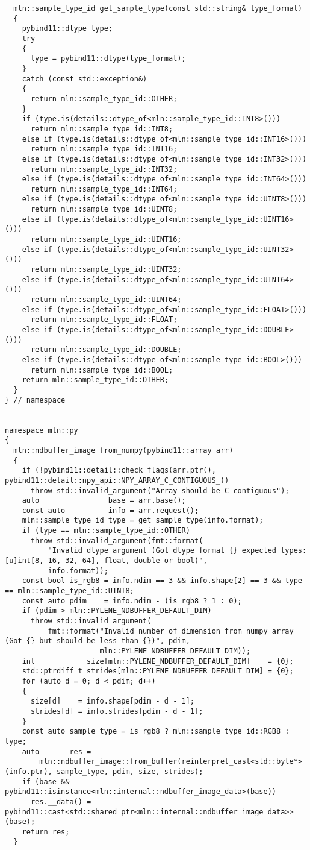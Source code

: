 \begin{verbatim}
  mln::sample_type_id get_sample_type(const std::string& type_format)
  {
    pybind11::dtype type;
    try
    {
      type = pybind11::dtype(type_format);
    }
    catch (const std::exception&)
    {
      return mln::sample_type_id::OTHER;
    }
    if (type.is(details::dtype_of<mln::sample_type_id::INT8>()))
      return mln::sample_type_id::INT8;
    else if (type.is(details::dtype_of<mln::sample_type_id::INT16>()))
      return mln::sample_type_id::INT16;
    else if (type.is(details::dtype_of<mln::sample_type_id::INT32>()))
      return mln::sample_type_id::INT32;
    else if (type.is(details::dtype_of<mln::sample_type_id::INT64>()))
      return mln::sample_type_id::INT64;
    else if (type.is(details::dtype_of<mln::sample_type_id::UINT8>()))
      return mln::sample_type_id::UINT8;
    else if (type.is(details::dtype_of<mln::sample_type_id::UINT16>()))
      return mln::sample_type_id::UINT16;
    else if (type.is(details::dtype_of<mln::sample_type_id::UINT32>()))
      return mln::sample_type_id::UINT32;
    else if (type.is(details::dtype_of<mln::sample_type_id::UINT64>()))
      return mln::sample_type_id::UINT64;
    else if (type.is(details::dtype_of<mln::sample_type_id::FLOAT>()))
      return mln::sample_type_id::FLOAT;
    else if (type.is(details::dtype_of<mln::sample_type_id::DOUBLE>()))
      return mln::sample_type_id::DOUBLE;
    else if (type.is(details::dtype_of<mln::sample_type_id::BOOL>()))
      return mln::sample_type_id::BOOL;
    return mln::sample_type_id::OTHER;
  }
} // namespace


namespace mln::py
{
  mln::ndbuffer_image from_numpy(pybind11::array arr)
  {
    if (!pybind11::detail::check_flags(arr.ptr(), pybind11::detail::npy_api::NPY_ARRAY_C_CONTIGUOUS_))
      throw std::invalid_argument("Array should be C contiguous");
    auto                base = arr.base();
    const auto          info = arr.request();
    mln::sample_type_id type = get_sample_type(info.format);
    if (type == mln::sample_type_id::OTHER)
      throw std::invalid_argument(fmt::format(
          "Invalid dtype argument (Got dtype format {} expected types: [u]int[8, 16, 32, 64], float, double or bool)",
          info.format));
    const bool is_rgb8 = info.ndim == 3 && info.shape[2] == 3 && type == mln::sample_type_id::UINT8;
    const auto pdim    = info.ndim - (is_rgb8 ? 1 : 0);
    if (pdim > mln::PYLENE_NDBUFFER_DEFAULT_DIM)
      throw std::invalid_argument(
          fmt::format("Invalid number of dimension from numpy array (Got {} but should be less than {})", pdim,
                      mln::PYLENE_NDBUFFER_DEFAULT_DIM));
    int            size[mln::PYLENE_NDBUFFER_DEFAULT_DIM]    = {0};
    std::ptrdiff_t strides[mln::PYLENE_NDBUFFER_DEFAULT_DIM] = {0};
    for (auto d = 0; d < pdim; d++)
    {
      size[d]    = info.shape[pdim - d - 1];
      strides[d] = info.strides[pdim - d - 1];
    }
    const auto sample_type = is_rgb8 ? mln::sample_type_id::RGB8 : type;
    auto       res =
        mln::ndbuffer_image::from_buffer(reinterpret_cast<std::byte*>(info.ptr), sample_type, pdim, size, strides);
    if (base && pybind11::isinstance<mln::internal::ndbuffer_image_data>(base))
      res.__data() = pybind11::cast<std::shared_ptr<mln::internal::ndbuffer_image_data>>(base);
    return res;
  }



\end{verbatim}
